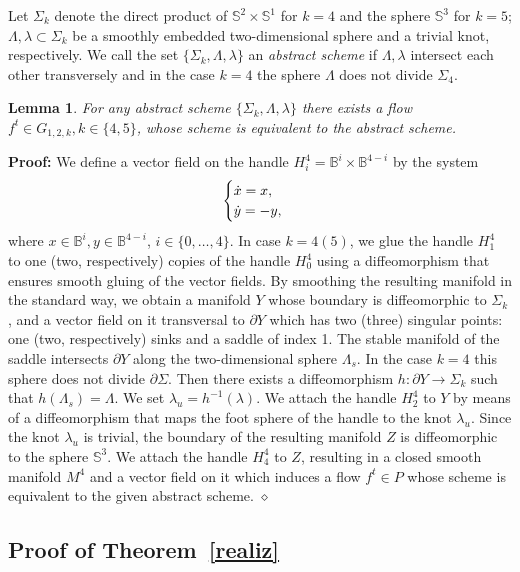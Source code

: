 \documentclass[%
 aip,
 amsmath,amssymb,
preprint,%
]{revtex4-1}
\newtheorem{lemma}{Lemma}[section]
\newenvironment{proof}{{\bf Proof:}}
{\hfill $\diamond$\medskip}
\begin{document}
Let $\Sigma_k$ denote the direct product of $\mathbb S^2\times \mathbb S^1$ for $k=4$ and the sphere $\mathbb S^3$ for $k=5$; $\Lambda, \lambda\subset \Sigma_k$ be a smoothly embedded two-dimensional sphere and a trivial knot, respectively. We call  the set $\{\Sigma_k, \Lambda, \lambda\}$  an {\it abstract scheme} if $\Lambda, \lambda$ intersect each other  transversely and in the case $k=4$ the sphere $\Lambda$ does not divide $\Sigma_4$.

\begin{lemma}\label{rea} For any abstract scheme $\{\Sigma_k, \Lambda, \lambda\}$
there exists a flow $f^t\in G_{1,2,k}, k\in \{4,5\}$, whose scheme is equivalent to the abstract scheme.  
\end{lemma}
\begin{proof} We define a vector field on the handle $H^4_i=\mathbb B^i\times \mathbb B^{4-i}$   by the system $$\begin{cases}\dot{x}=x,\cr \dot y =-y,\end{cases}$$ where $x\in \mathbb B^i, y\in \mathbb B^{4-i}$, $i\in \{0,\dots, 4\}$. In case $k=4(5)$, we glue the handle $H^4_1$ to one (two, respectively) copies of the handle $H^4_0$ using a diffeomorphism that ensures smooth gluing of the vector fields. By smoothing the resulting manifold in the standard way, we obtain a manifold $Y$ whose boundary is diffeomorphic to $\Sigma_k$, and a vector field on it transversal to $\partial Y$ which has two (three) singular points: one (two, respectively) sinks and a saddle of index 1. The stable manifold of the saddle intersects $\partial Y$ along the two-dimensional sphere $\Lambda_s$. In the case $k=4$ this sphere does not divide $\partial \Sigma$. Then there exists a diffeomorphism $h: \partial Y\to \Sigma_k$ such that $h(\Lambda_s)=\Lambda$. We set $\lambda_u=h^{-1}(\lambda)$. We attach the handle $H^4_2$ to $Y$ by means of  a diffeomorphism that maps the foot sphere of the handle  to the knot $\lambda_u$. Since the knot $\lambda_u$ is trivial, the boundary of the resulting manifold $Z$ is diffeomorphic to the sphere $\mathbb S^3$. We attach the handle $H^4_4$ to $Z$, resulting in a closed smooth manifold $M^4$ and a vector field on it which  induces a flow $f^t\in P$ whose scheme is equivalent to the given abstract scheme.
\end{proof}

\subsection{Proof of Theorem~\ref{realiz}}
\end{document}

